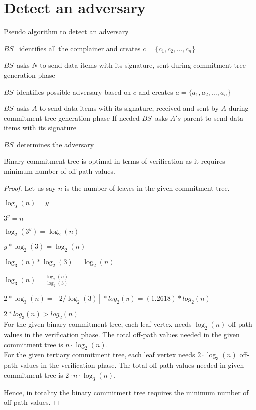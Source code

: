 \section{Detect an adversary}
\begin{algorithm}
\caption{Pseudo algorithm to detect an adversary}

	\begin{algorithmic}[1]

			\STATE $BS$ \ identifies all the complainer and creates $c = \{c_{1}, c_{2}, \dotsc, c_{n}\}$

				\STATE $BS$\ asks $N$ to send data-items with its signature, sent during commitment tree generation phase
			
			\ENDFOR

			\STATE $BS$\ identifies possible adversary based on $c$ and creates $a = \{a_{1},a_{2},\dotsc,a_{n}\}$


				\STATE $BS$\ asks $A$ to send data-items with its signature, received and sent by $A$ during commitment tree generation phase
				\STATE If needed $BS$\  asks $A's$ parent to send data-items with its signature
	
			\ENDFOR

			\STATE $BS$\ determines the adversary 

	\end{algorithmic}
\end{algorithm}

\begin{theorem}
	\label{Commitment tree}
	Binary commitment tree is optimal in terms of verification as it requires minimum number of off-path values.
\end{theorem}

\begin{proof}
	Let us say $n$ is the number of leaves in the given commitment tree.

	$ \log _3( n ) = y $

	$ 3^y = n $

	$ \log_2( 3^y ) = \log_2( n ) $

	$ y * \log_2( 3 ) = \log_2( n ) $

	$ \log_3( n )*\log_2( 3 ) = \log_2( n ) $

	$ \log_3( n ) = \frac{ {\log _2 ( n )} }{{\log _2 ( 3 )}} $

	$ 2 * \log_3( n ) = [2 / \log_2( 3 ) ]* log_2( n ) = ( 1.2618 ) * log_2( n ) $

	$ 2 * log_3( n ) > log_2( n ) $ \\
	For the given binary commitment tree, each leaf vertex needs $\log_{2}(n)$ off-path values in the verification phase.
	The total off-path values needed in the given commitment tree is $n \cdot \log_{2}(n)$.\\
	For the given tertiary commitment tree, each leaf vertex needs $2 \cdot \log_{3}(n)$ off-path values in the verification phase.
	The total off-path values needed in given commitment tree is $2 \cdot n \cdot \log_{3}(n)$.

	Hence, in totality the binary commitment tree requires the minimum number of off-path values.
\end{proof}